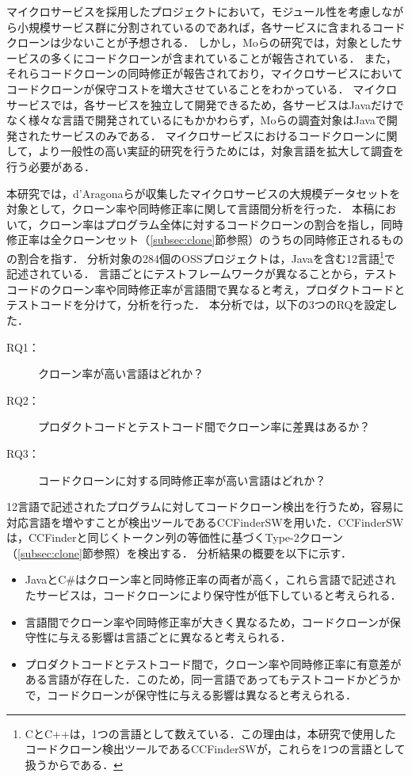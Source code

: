 \documentclass[T,J]{fose}
\begin{document}
マイクロサービスを採用したプロジェクトにおいて，モジュール性を考慮しながら小規模サービス群に分割されているのであれば，各サービスに含まれるコードクローンは少ないことが予想される．
しかし，Moらの研究では，対象としたサービスの多くにコードクローンが含まれていることが報告されている\cite{mo2021existence}．
また，それらコードクローンの同時修正が報告されており，マイクロサービスにおいてコードクローンが保守コストを増大させていることをわかっている\cite{mo2021existence}．
マイクロサービスでは，各サービスを独立して開発できるため，各サービスはJavaだけでなく様々な言語で開発されているにもかかわらず，Moらの調査対象はJavaで開発されたサービスのみである．
マイクロサービスにおけるコードクローンに関して，より一般性の高い実証的研究を行うためには，対象言語を拡大して調査を行う必要がある．

本研究では，d'Aragonaらが収集したマイクロサービスの大規模データセット\cite{amoroso2024dataset}を対象として，クローン率や同時修正率に関して言語間分析を行った．
本稿において，クローン率はプログラム全体に対するコードクローンの割合を指し，同時修正率は全クローンセット（\ref{subsec:clone}節参照）のうちの同時修正されるものの割合を指す．
分析対象の284個のOSSプロジェクトは，Javaを含む12言語\footnote{CとC++は，1つの言語として数えている．この理由は，本研究で使用したコードクローン検出ツールであるCCFinderSWが，これらを1つの言語として扱うからである．}で記述されている．
言語ごとにテストフレームワークが異なることから，テストコードのクローン率や同時修正率が言語間で異なると考え，プロダクトコードとテストコードを分けて，分析を行った．
本分析では，以下の3つのRQを設定した．
\begin{description}
    \item[RQ1：] クローン率が高い言語はどれか？
    \item[RQ2：] プロダクトコードとテストコード間でクローン率に差異はあるか？
    \item[RQ3：] コードクローンに対する同時修正率が高い言語はどれか？
\end{description}
12言語で記述されたプログラムに対してコードクローン検出を行うため，容易に対応言語を増やすことが検出ツールであるCCFinderSW\cite{CCFinderSW}を用いた．CCFinderSWは，CCFinder\cite{CCFinder}と同じくトークン列の等価性に基づくType-2クローン（\ref{subsec:clone}節参照）を検出する．
分析結果の概要を以下に示す．
\begin{itemize}
    \item JavaとC\#はクローン率と同時修正率の両者が高く，これら言語で記述されたサービスは，コードクローンにより保守性が低下していると考えられる．
    \item 言語間でクローン率や同時修正率が大きく異なるため，コードクローンが保守性に与える影響は言語ごとに異なると考えられる．
    \item プロダクトコードとテストコード間で，クローン率や同時修正率に有意差がある言語が存在した．このため，同一言語であってもテストコードかどうかで，コードクローンが保守性に与える影響は異なると考えられる．
\end{itemize}
\end{document}
